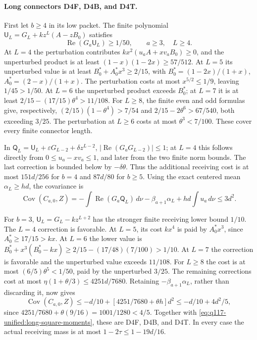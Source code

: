 \paragraph{Long connectors D4F, D4B, and D4T.}
First let \(b\ge4\) in its low packet. The finite polynomial
\(\mathsf U_L=G_L+kz^L(A-zB_0)\) satisfies
\[
 \operatorname{Re}(G_a\mathsf U_L)\ge1/50,
 \qquad a\ge3,\quad L\ge4.
\]
At \(L=4\) the perturbation contributes
\(kx^2(u_a A+xv_aB_0)\ge0\), and the unperturbed product is
at least \((1-x)(1-2x)\ge57/512\).
At \(L=5\) its unperturbed value is at least
\(B_0^*+A_0^*x^3\ge2/15\), with
\(B_0^*=(1-2x)/(1+x)\), \(A_0^*=(2-x)/(1+x)\).
The perturbation costs at most \(x^{5/2}\le1/9\), leaving
\(1/45>1/50\). At \(L=6\) the unperturbed product exceeds
\(B_0^*\); at \(L=7\) it is at least
\(2/15-(17/15)\theta^4>11/108\).
For \(L\ge8\), the finite even and odd formulas give, respectively,
\((2/15)(1-\theta^4)>7/54\) and
\(2/15-2\theta^6>67/540\), both exceeding \(3/25\).
The perturbation at \(L\ge6\) costs at most \(\theta^3<7/100\).
These cover every finite connector length.

In \(\mathsf Q_L=\mathsf U_L+\varepsilon G_{L-2}
 +\delta z^{L-2}\),
\(|\operatorname{Re}(G_aG_{L-2})|\le1\); at \(L=4\) this
follows directly from \(0\le u_a-xv_a\le1\), and later from
the two finite norm bounds. The last correction is bounded below
by \(-\delta\theta\). Thus the additional receiving cost is at
most \(151d/256\) for \(b=4\) and \(87d/80\) for \(b\ge5\).
Using the exact centered mean \(\alpha_L\ge hd\), the covariance is
\begin{equation}\label{eq:q117-unified:long-square-covariance}
 \operatorname{Cov}(C_{a,0},Z)
 =-\int\operatorname{Re}(G_a\mathsf Q_L)\,d\nu
       -\beta_{a+1}\alpha_L+hd\int u_a\,d\nu
 \le3d^2.
\end{equation}

For \(b=3\), \(\mathsf U_L=G_L-kz^{L+2}\) has the stronger
finite receiving lower bound \(1/10\). The \(L=4\) correction
is favorable. At \(L=5\), its cost \(kx^4\) is paid by
\(A_0^*x^3\), since \(A_0^*\ge17/15>kx\).
At \(L=6\) the lower value is
\(B_0^*+x^3(B_0^*-kx)\ge2/15-(17/48)(7/100)>1/10\).
At \(L=7\) the correction is favorable and the unperturbed
value exceeds \(11/108\). For \(L\ge8\) the cost is at most
\((6/5)\theta^5<1/50\), paid by the unperturbed \(3/25\).
The remaining corrections cost at most
\(\eta(1+\theta/3)\le4251d/7680\).
Retaining \(-\beta_{a+1}\alpha_L\), rather than discarding it,
now gives
\[
 \operatorname{Cov}(C_{a,0},Z)
 \le-d/10+[4251/7680+\theta h]d^2
 \le-d/10+4d^2/5,
\]
since \(4251/7680+\theta(9/16)=1001/1280<4/5\).
Together with \eqref{eq:q117-unified:long-square-moments}, these
are D4F, D4B, and D4T. In every case the actual receiving mass
is at most \(1-2\tau\le1-19d/16\).

